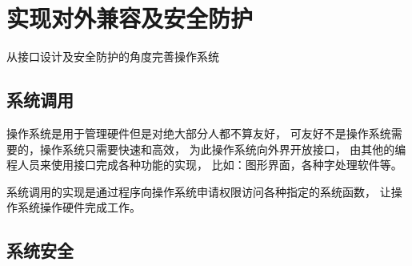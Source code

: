\chapter{实现对外兼容及安全防护}

从接口设计及安全防护的角度完善操作系统

\section{系统调用}

操作系统是用于管理硬件但是对绝大部分人都不算友好，
可友好不是操作系统需要的，操作系统只需要快速和高效，
为此操作系统向外界开放接口，
由其他的编程人员来使用接口完成各种功能的实现，
比如：图形界面，各种字处理软件等。

系统调用的实现是通过程序向操作系统申请权限访问各种指定的系统函数，
让操作系统操作硬件完成工作。

\section{系统安全}
    